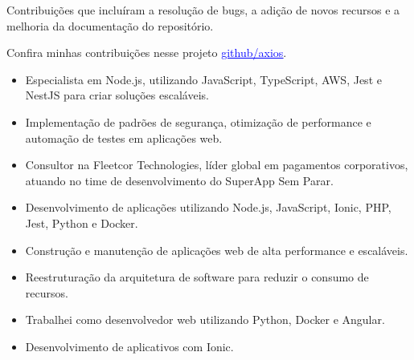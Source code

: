 \documentclass[10pt,a4paper,ragged2e,withhyper]{altacv}
\begin{document}
\begin{paracol}{2}


Contribuições que incluíram a resolução de bugs, a adição de novos recursos e a melhoria da documentação do repositório.


Confira minhas contribuições nesse projeto \href{https://github.com/axios/axios/issues?q=commenter%3AWillianAgostini}{\textcolor{blue}{\underline{github/axios}}}.



\begin{itemize}
  \item Especialista em Node.js, utilizando JavaScript, TypeScript, AWS, Jest e NestJS para criar soluções escaláveis.
  \item Implementação de padrões de segurança, otimização de performance e automação de testes em aplicações web.
  \item Consultor na Fleetcor Technologies, líder global em pagamentos corporativos, atuando no time de desenvolvimento do SuperApp Sem Parar.
\end{itemize}

\divider

\begin{itemize}
  \item Desenvolvimento de aplicações utilizando Node.js, JavaScript, Ionic, PHP, Jest, Python e Docker.
  \item Construção e manutenção de aplicações web de alta performance e escaláveis.
\end{itemize}

\divider

\begin{itemize}
  \item Reestruturação da arquitetura de software para reduzir o consumo de recursos.
  \item Trabalhei como desenvolvedor web utilizando Python, Docker e Angular.
  \item Desenvolvimento de aplicativos com Ionic.
\end{itemize}


\end{paracol}
\end{document}
